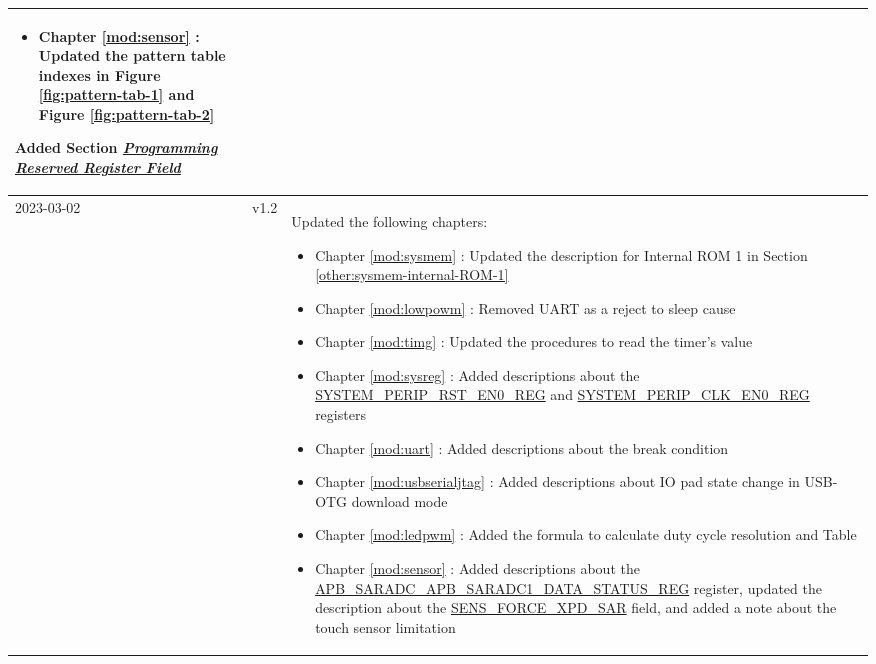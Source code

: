 \begin{longtable}[l]{ | m{2cm} | m{1.5cm} | m{12cm} | }
\begin{itemize}
        \item Chapter \ref{mod:sensor} \textit{\nameref{mod:sensor}}: Updated the pattern table indexes in Figure \ref{fig:pattern-tab-1} and Figure \ref{fig:pattern-tab-2}
    \end{itemize}
    Added Section \hyperref[programming-reserved-field]{\textit{Programming Reserved Register Field}}
    \\\hline
    2023-03-02        & v1.2  &
    Updated the following chapters:
    \begin{itemize}
        \item Chapter \ref{mod:sysmem} \textit{\nameref{mod:sysmem}}: Updated the description for Internal ROM 1 in Section \ref{other:sysmem-internal-ROM-1} \textit{\nameref{other:sysmem-internal-ROM-1}}
        \item Chapter \ref{mod:lowpowm} \textit{\nameref{mod:lowpowm}}: Removed UART as a reject to sleep cause %
        \item Chapter \ref{mod:timg} \textit{\nameref{mod:timg}}: Updated the procedures to read the timer's value  %
        \item Chapter \ref{mod:sysreg} \textit{\nameref{mod:sysreg}}: Added descriptions about the \hyperref[regdesc:SYSTEMPERIPRSTEN0REG]{SYSTEM\_PERIP\_RST\_EN0\_REG} and \hyperref[regdesc:SYSTEMPERIPCLKEN0REG]{SYSTEM\_PERIP\_CLK\_EN0\_REG} registers%
        \item Chapter \ref{mod:uart} \textit{\nameref{mod:uart}}: Added descriptions about the break condition %
        \item Chapter \ref{mod:usbserialjtag} \textit{\nameref{mod:usbserialjtag}}: Added descriptions about IO pad state change in USB-OTG download mode%
        \item Chapter \ref{mod:ledpwm} \textit{\nameref{mod:ledpwm}}: Added the formula to calculate duty cycle resolution and Table  \textit{\nameref{tab:ledc-common-freq-res}} %
        \item Chapter \ref{mod:sensor} \textit{\nameref{mod:sensor}}: Added descriptions about the \hyperref[regdesc:APBSARADCAPBSARADC1DATASTATUSREG]{APB\_SARADC\_APB\_SARADC1\_DATA\_STATUS\_REG} register, updated the description about the \hyperref[fielddesc:SENSFORCEXPDSAR]{SENS\_FORCE\_XPD\_SAR} field, and added a note about the touch sensor limitation

\end{itemize}
\end{longtable}
